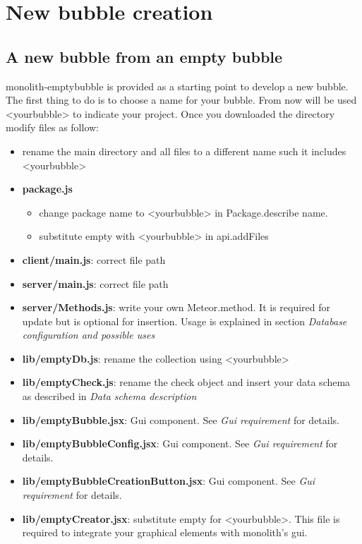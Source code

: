 \section{New bubble creation}
\subsection{A new bubble from an empty bubble}
monolith-emptybubble is provided as a starting point to develop a new bubble.
The first thing to do is to choose a name for your bubble. From now will be used
 <yourbubble> to indicate your project.
Once you downloaded the directory modify files as follow:
\begin{itemize}
\item rename the main directory and all files to a different name such it includes <yourbubble>
\item \textbf{package.js}
	\begin{itemize}
	\item change package name to <yourbubble> in Package.describe name.
	\item substitute empty with <yourbubble> in api.addFiles
	\end{itemize}
	\item \textbf{client/main.js}: correct file path
	\item \textbf{server/main.js}: correct file path
	\item \textbf{server/Methods.js}: write your own Meteor.method. It is required for update but is optional for insertion. Usage is explained in section \emph{Database configuration and possible uses}
	\item \textbf{lib/emptyDb.js}: rename the collection using <yourbubble>
	\item \textbf{lib/emptyCheck.js}: rename the check object and insert your data schema as described in \emph{Data schema description}
	\item \textbf{lib/emptyBubble.jsx}: 
	Gui component. See \emph{Gui requirement} for details.
	\item \textbf{lib/emptyBubbleConfig.jsx}: 
	Gui component. See \emph{Gui requirement} for details.
	\item \textbf{lib/emptyBubbleCreationButton.jsx}: 
	Gui component. See \emph{Gui requirement} for details.
	\item \textbf{lib/emptyCreator.jsx}: substitute empty for
     <yourbubble>. This file is required to integrate your graphical
     elements with monolith's gui.
\end{itemize}

